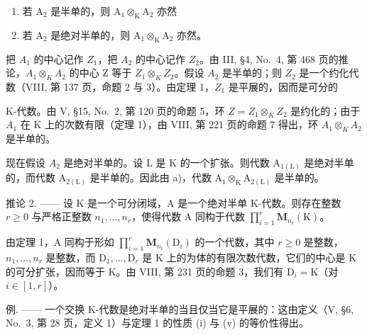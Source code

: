 \begin{enumerate}
\def\labelenumi{\alph{enumi})}
\item
  若 \(\mathrm{A}_2\) 是半单的，则 \(\mathrm{A}_1\otimes_{\mathrm{K}}\mathrm{A}_2\) 亦然
\item
  若 \(\mathrm{A}_2\) 是绝对半单的，则 \(\mathrm{A}_1\otimes_{\mathrm{K}}\mathrm{A}_2\) 亦然。
\end{enumerate}

把 \(A_{1}\) 的中心记作 \(Z_{1}\)，把 \(A_{2}\) 的中心记作 \(Z_{2}\)。由 III, §4, No.~4, 第 468 页的推论，\(A_{1} \otimes_{K} A_{2}\) 的中心 Z 等于 \(Z_{1} \otimes_{K} Z_{2}\)。假设 \(A_{2}\) 是半单的；则 \(Z_{2}\) 是一个约化代数（VIII, 第 137 页，命题 2 与 3）。由定理 1，\(Z_{1}\) 是平展的，因而是可分的

K-代数。由 V, §15, No.~2, 第 120 页的命题 5，环 \(Z = Z_{1} \otimes_{K} Z_{2}\) 是约化的；由于 \(A_{1}\) 在 K 上的次数有限（定理 1），由 VIII, 第 221 页的命题 7 得出，环 \(A_{1} \otimes_{K} A_{2}\) 是半单的。

现在假设 \(A_{2}\) 是绝对半单的。设 L 是 K 的一个扩张。则代数 \(\mathrm{A}_{1(\mathrm{L})}\) 是绝对半单的，而代数 \(\mathrm{A}_{2(\mathrm{L})}\) 是半单的。因此由 a)，代数 \(\mathrm{A}_{1} \otimes_{\mathrm{K}} \mathrm{A}_{2(\mathrm{L})}\) 是半单的。

推论 2. —— 设 K 是一个可分闭域，A 是一个绝对半单 K-代数。则存在整数 \(r \geqslant 0\) 与严格正整数 \(n_{1}, \ldots, n_{r}\)，使得代数 A 同构于代数 \(\prod_{i=1}^{r} \mathbf{M}_{n_{i}}(\mathrm{K})\)。

由定理 1，A 同构于形如 \(\prod_{i=1}^{r} \mathbf{M}_{n_i}(\mathrm{D}_i)\) 的一个代数，其中 \(r \geqslant 0\) 是整数，\(n_1, \ldots, n_r\) 是整数，而 \(\mathrm{D}_1, \ldots, \mathrm{D}_r\) 是 K 上的为体的有限次数代数，它们的中心是 K 的可分扩张，因而等于 K。由 VIII, 第 231 页的命题 3，我们有 \(\mathrm{D}_i = \mathrm{K}\)（对 \(i \in [1, r]\)）。

例. —— 一个交换 K-代数是绝对半单的当且仅当它是平展的：这由定义（V, §6, No.~3, 第 28 页，定义 1）与定理 1 的性质 (i) 与 (v) 的等价性得出。

